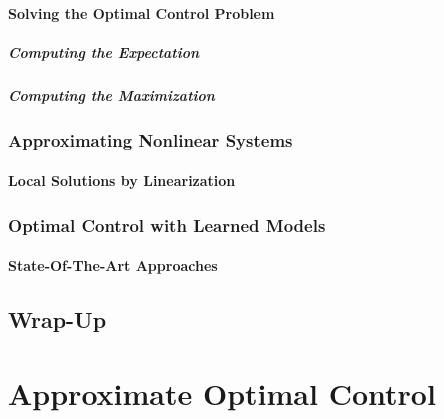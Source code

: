 			\subsubsection{Solving the Optimal Control Problem} %

				\paragraph{Computing the Expectation} %

				\paragraph{Computing the Maximization} %

		\subsection{Approximating Nonlinear Systems} %

			\subsubsection{Local Solutions by Linearization} %

		\subsection{Optimal Control with Learned Models} %

			\subsubsection{State-Of-The-Art Approaches} %

	\section{Wrap-Up} %

\chapter{Approximate Optimal Control} %

